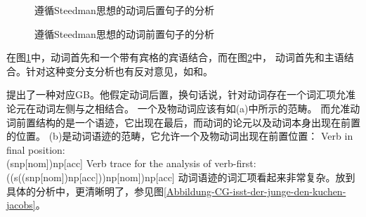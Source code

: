 \begin{figure}
\centerline{%
}
\caption{\label{Abbildung-CG-der-Mann-der-Frau-das-Buch-gibt}遵循Steedman思想的动词后置句子的分析}
\end{figure}%
\begin{figure}
\centerline{%
}
\caption{\label{Abbildung-CG-gibt-der-Mann-der-Frau-das-Buch}遵循Steedman思想的动词前置句子的分析}
\end{figure}%
在图\ref{Abbildung-CG-der-Mann-der-Frau-das-Buch-gibt}中，动词首先和一个带有宾格的宾语结合，而在图\ref{Abbildung-CG-gibt-der-Mann-der-Frau-das-Buch}中，
动词首先和主语结合。针对这种变分支分析也有反对意见，如和。

\citet{Jacobs91a}提出了一种对应GB。他假定动词后置，换句话说，针对动词存在一个词汇项允准论元在动词左侧与之相结合。
一个及物动词应该有如(a)中所示的范畴。
而允准动词前置结构的是一个语迹，它出现在最后，而动词的论元以及动词本身出现在前置的位置。
(b)是动词语迹的范畴，它允许一个及物动词出现在前置位置：
\eal
\ex Verb in final position:\\
    (s\bs np[nom])\bs np[acc]
\ex Verb trace for the analysis of verb-first:\\
    ((s\bs ((s\bs np[nom])\bs np[acc]))\bs np[nom])\bs np[acc]
\zl
动词语迹的词汇项看起来非常复杂。放到具体的分析中，更清晰明了，参见图\vref{Abbildung-CG-isst-der-junge-den-kuchen-jacobs}。

